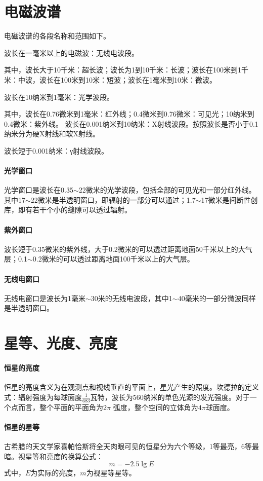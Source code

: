 \section{电磁波谱}
电磁波谱的各段名称和范围如下。

波长在一毫米以上的电磁波：无线电波段。

其中，波长大于10千米：超长波；波长为1到10千米：长波；波长在100米到1千米：中波，波长在100米到10米：短波；波长在1毫米到10米：微波。

波长在10纳米到1毫米：光学波段。

其中，波长在0.76微米到1毫米：红外线；0.4微米到0.76微米：可见光；10纳米到0.4微米：紫外线。
波长在0.001纳米到10纳米：X射线波段。按照波长是否小于0.1纳米分为硬X射线和软X射线。

波长短于0.001纳米：γ射线波段。
\paragraph{光学窗口}光学窗口是波长在0.35$\sim$22微米的光学波段，包括全部的可见光和一部分红外线。其中17$\sim$22微米是半透明窗口，即辐射的一部分可以通过；1.7$\sim$17微米是间断性创库，即有若干个小的缝隙可以透过辐射。
\paragraph{紫外窗口}波长短于0.35微米的紫外线，大于0.2微米的可以透过距离地面50千米以上的大气层；0.1$\sim$0.2微米的可以透过距离地面100千米以上的大气层。
\paragraph{无线电窗口}无线电窗口是波长为1毫米$\sim$30米的无线电波段，其中1$\sim$40毫米的一部分微波同样是半透明窗口。
\section{星等、光度、亮度}
\paragraph{恒星的亮度}恒星的亮度含义为在观测点和视线垂直的平面上，星光产生的照度。坎德拉的定义式：辐射强度为每球面度$\frac{1}{683}$瓦特，波长为560纳米的单色光源的发光强度。对于一个点而言，整个平面的平面角为$2\pi$
弧度，整个空间的立体角为$4\pi$球面度。
\paragraph{恒星的星等}古希腊的天文学家喜帕恰斯将全天肉眼可见的恒星分为六个等级，1等最亮，6等最暗。视星等和亮度的换算公式：
\begin{equation}
	m=-2.5\lg E
\end{equation}
式中，$E$为实际的亮度，$m$为视星等星等。

